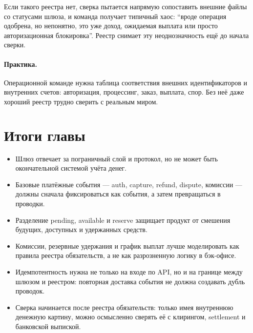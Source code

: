 Если такого реестра нет, сверка пытается напрямую
сопоставить внешние файлы со статусами шлюза, и команда получает
типичный хаос: \enquote{вроде операция одобрена, но непонятно,
это уже доход, ожидаемая выплата или просто авторизационная блокировка}.
Реестр снимает эту неоднозначность ещё до начала сверки.

\paragraph{Практика.}
Операционной команде нужна таблица соответствия внешних идентификаторов и внутренних счетов: авторизация, процессинг, заказ, выплата, спор. Без неё даже хороший реестр трудно сверить с реальным миром.


\section*{Итоги главы}
\begin{itemize}
  \item Шлюз отвечает за пограничный слой и протокол, но не может
        быть окончательной системой учёта денег.
  \item Базовые платёжные события — auth, capture, refund, dispute,
        комиссии — должны сначала фиксироваться как события, а затем
        превращаться в проводки.
  \item Разделение pending, available и reserve защищает продукт
        от смешения будущих, доступных и удержанных средств.
  \item Комиссии, резервные удержания и график выплат лучше моделировать
        как правила реестра обязательств, а не как разрозненную логику в бэк-офисе.
  \item Идемпотентность нужна не только на входе по API, но и на границе
        между шлюзом и реестром: повторная доставка события не должна
        создавать дубль проводок.
  \item Сверка начинается после реестра обязательств: только имея внутреннюю
        денежную картину, можно осмысленно сверять её с клирингом,
        settlement и банковской выпиской.
\end{itemize}
